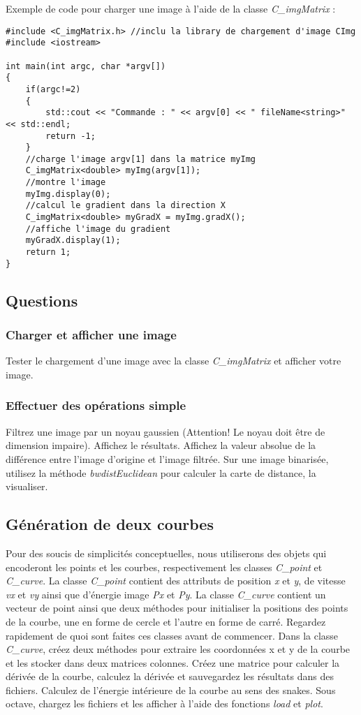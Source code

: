 \documentclass[10pt,a4paper]{article}
\begin{document}
\clearpage
\noindent Exemple de code pour charger une image \`{a} l'aide de la classe \textit{C\_imgMatrix} : 
\begin{verbatim}
#include <C_imgMatrix.h> //inclu la library de chargement d'image CImg
#include <iostream>

int main(int argc, char *argv[])
{
    if(argc!=2)
    {
        std::cout << "Commande : " << argv[0] << " fileName<string>" << std::endl;
        return -1;
    }
    //charge l'image argv[1] dans la matrice myImg
    C_imgMatrix<double> myImg(argv[1]);
    //montre l'image
    myImg.display(0);
    //calcul le gradient dans la direction X
    C_imgMatrix<double> myGradX = myImg.gradX();
    //affiche l'image du gradient
    myGradX.display(1);
    return 1;
}
\end{verbatim}

\subsection{Questions}
\subsubsection{Charger et afficher une image}
Tester le chargement d'une image avec la classe \textit{C\_imgMatrix} et afficher votre image.
\subsubsection{Effectuer des op\'{e}rations simple}
Filtrez une image par un noyau gaussien (Attention! Le noyau doit \^{e}tre de dimension impaire). Affichez le r\'{e}sultats. Affichez la valeur absolue de la diff\'{e}rence entre l'image d'origine et l'image filtr\'{e}e. Sur une image binaris\'{e}e, utilisez la m\'{e}thode \textit{bwdistEuclidean} pour calculer la carte de distance, la visualiser.

\subsection{G\'{e}n\'{e}ration de deux courbes}
Pour des soucis de simplicit\'{e}s conceptuelles, nous utiliserons des objets qui encoderont les points et les courbes, respectivement les classes \textit{C\_point} et \textit{C\_curve}. La classe \textit{C\_point} contient des attributs de position \textit{x} et \textit{y}, de vitesse \textit{vx} et \textit{vy} ainsi que d'\'{e}nergie image \textit{Px} et \textit{Py}. La classe \textit{C\_curve} contient un vecteur de point ainsi que deux m\'{e}thodes pour initialiser la positions des points de la courbe, une en forme de cercle et l'autre en forme de carr\'{e}. Regardez rapidement de quoi sont faites ces classes avant de commencer.
Dans la classe \textit{C\_curve}, cr\'{e}ez deux m\'{e}thodes pour extraire les coordonn\'{e}es x et y de la courbe et les stocker dans deux matrices colonnes. Cr\'{e}ez une matrice pour calculer la d\'{e}riv\'{e}e de la courbe, calculez la d\'{e}riv\'{e}e et sauvegardez les r\'{e}sultats dans des fichiers. Calculez de l'\'{e}nergie int\'{e}rieure de la courbe au sens des snakes. Sous octave, chargez les fichiers et les afficher \`{a} l'aide des fonctions \textit{load} et \textit{plot}.
\end{document}
